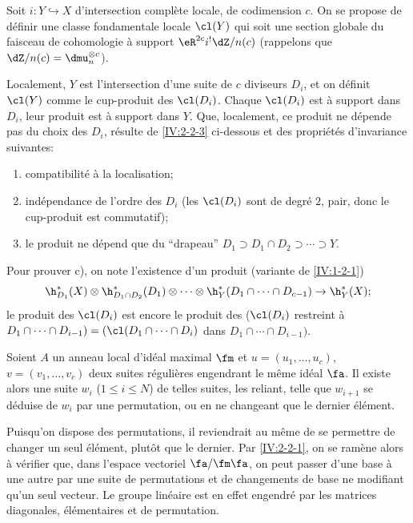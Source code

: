 Soit $i:Y\hookrightarrow X$ d'intersection complète locale, de codimension 
$c$. On se propose de définir une classe fondamentale locale 
$\cl(Y)$ qui soit une section globale du faisceau de cohomologie à support 
$\eR^{2c}i^! \dZ/n(c)$ (rappelons que $\dZ/n(c)=\dmu_n^{\otimes c}$). 

Localement, $Y$ est l'intersection d'une suite de $c$ diviseurs $D_i$, et on 
définit $\cl(Y)$ comme le cup-produit des $\cl(D_i)$. Chaque $\cl(D_i)$ est 
à support dans $D_i$, leur produit est à support dans $Y$. Que, localement, 
ce produit ne dépende pas du choix des $D_i$, résulte de \ref{IV:2-2-3} 
ci-dessous et des propriétés d'invariance suivantes:
\begin{enumerate}[\indent a)]
  \item compatibilité à la localisation;
  \item indépendance de l'ordre des $D_i$ (les $\cl(D_i)$ sont de degré 
    $2$, pair, donc le cup-produit est commutatif);
  \item le produit ne dépend que du ``drapeau'' 
    $D_1\supset D_1\cap D_2\supset \cdots\supset Y$. 
\end{enumerate}
Pour prouver c), on note l'existence d'un produit (variante de \ref{IV:1-2-1}) 
\[
  \h_{D_1}^*(X)\otimes \h_{D_1\cap D_2}^*(D_1)\otimes \cdots \otimes \h_Y^*(D_1\cap \cdots \cap D_{c-1}) \to \h_Y^*(X) \text{;}
\]
le produit des $\cl(D_i)$ est encore le produit des ($\cl(D_i)$ restreint à 
$D_1\cap \cdots \cap D_{i-1})=(\cl(D_1\cap \cdots \cap D_i)$ dans 
$D_1\cap \cdots \cap D_{i-1})$. 





\begin{lemma}\label{IV:2-2-3}
Soient $A$ un anneau local d'idéal maximal $\fm$ et $u=(u_1,\dots,u_c)$, 
$v=(v_1,\dots,v_c)$ deux suites régulières engendrant le même idéal 
$\fa$. Il existe alors une suite $w_i$ ($1\leqslant i\leqslant N$) de telles 
suites, les reliant, telle que $w_{i+1}$ se déduise de $w_i$ par une 
permutation, ou en ne changeant que le dernier élément.
\end{lemma}

Puisqu'on dispose des permutations, il reviendrait au même de se permettre de 
changer un seul élément, plutôt que le dernier. Par \ref{IV:2-2-1}, on se 
ramène alors à vérifier que, dans l'espace vectoriel $\fa/\fm\fa$, on 
peut passer d'une base à une autre par une suite de permutations et de 
changements de base ne modifiant qu'un seul vecteur. Le groupe linéaire est 
en effet engendré par les matrices diagonales, élémentaires et de 
permutation. 





